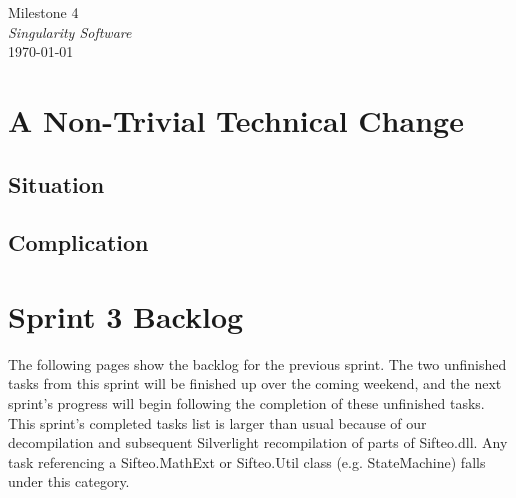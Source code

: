 \documentclass[12pt]{article}
\begin{document}
\begin{center}
	\LARGE{Milestone 4} \\
	\Large{\textit{Singularity Software}} \\
	\vspace{.05in}
	\normalsize{\today} \\
\end{center}

\section*{A Non-Trivial Technical Change}
\subsection*{Situation}


\subsection*{Complication}


\section*{Sprint 3 Backlog}
The following pages show the backlog for the previous sprint. The two unfinished tasks from this sprint will be finished up over the coming weekend, and the next sprint's progress will begin following the completion of these unfinished tasks.\\

This sprint's completed tasks list is larger than usual because of our decompilation and subsequent Silverlight recompilation of parts of Sifteo.dll. Any task referencing a Sifteo.MathExt or Sifteo.Util class (e.g. StateMachine) falls under this category.


\end{document}
